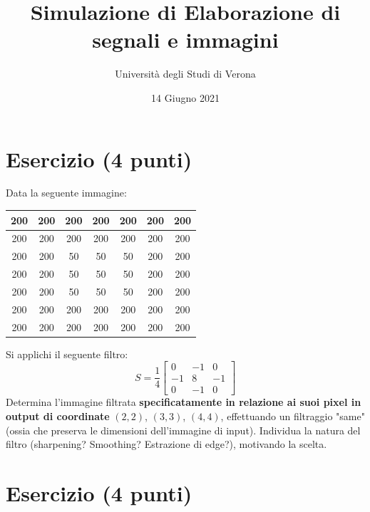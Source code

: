 \documentclass[a4paper]{article}
\begin{document}
	\author{Università degli Studi di Verona}
	\title{Simulazione di Elaborazione di segnali e immagini}
	\date{{\Large 14 Giugno 2021}}
	\maketitle
	
	\section{Esercizio (4 punti)}
	
	Data la seguente immagine:
	\begin{center}
		\begin{tabular}{| c | c | c | c | c | c | c |}
			\hline
			200 & 200 & 200 & 200 & 200 & 200 & 200 \\
			\hline
			200 & 200 & 200 & 200 & 200 & 200 & 200 \\
			\hline
			200 & 200 &  50 &  50 &  50 & 200 & 200 \\
			\hline
			200 & 200 &  50 &  50 &  50 & 200 & 200 \\
			\hline
			200 & 200 &  50 &  50 &  50 & 200 & 200 \\
			\hline
			200 & 200 & 200 & 200 & 200 & 200 & 200 \\
			\hline
			200 & 200 & 200 & 200 & 200 & 200 & 200 \\
			\hline
		\end{tabular}
	\end{center}
	Si applichi il seguente filtro:
	\begin{equation*}
		S = \dfrac{1}{4}\begin{bmatrix}
			 0 & -1 &  0 \\
			-1 &  8 & -1 \\
			 0 & -1 &  0
		\end{bmatrix}
	\end{equation*}
	Determina l'immagine filtrata \textbf{specificatamente in relazione ai suoi pixel in output di coordinate} $\left(2,2\right)$, $\left(3,3\right)$, $\left(4,4\right)$, effettuando un filtraggio "same" (ossia che preserva le dimensioni dell'immagine di input). Individua la natura del filtro (sharpening? Smoothing? Estrazione di edge?), motivando la scelta.
	
	\section{Esercizio (4 punti)}
	
\end{document}
